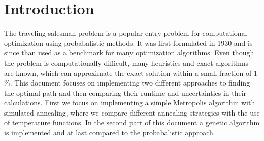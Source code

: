 \section{Introduction}
The traveling salesman problem is a popular entry problem for computational optimization using probabalistic methods.
It was first formulated in 1930 and is since than used as a benchmark for many optimization algorithms.
Even though the problem is computationally difficult, many heuristics and exact algorithms are known, which can approximate the exact solution within a small fraction of 1 \%.
This document focuses on implementing two different approaches to finding the optimal path and then comparing their runtime and uncertainties in their calculations.
First we focus on implementing a simple Metropolis algorithm with simulated annealing, where we compare different annealing strategies with the use of temperature functions.
In the second part of this document a genetic algorithm is implemented and at last compared to the probabalistic approach.
